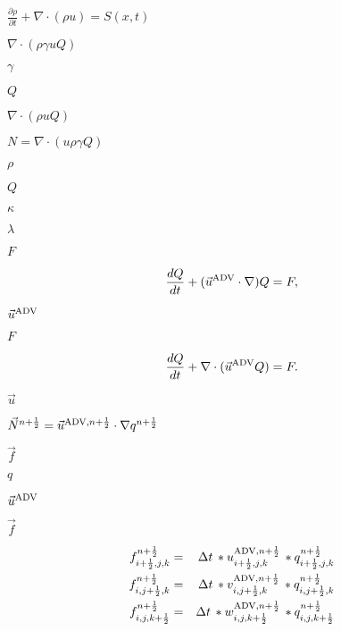 \documentclass{article}
\begin{document}
$ \frac{\partial \rho}{\partial t} + \nabla \cdot (\rho u) = S(x,t) $
\pagebreak

$ \nabla \cdot (\rho \gamma u Q)$
\pagebreak

$\gamma$
\pagebreak

$Q$
\pagebreak

$ \nabla \cdot (\rho u Q)$
\pagebreak

$N = \nabla \cdot (u \rho \gamma Q)$
\pagebreak

$\rho$
\pagebreak

$ Q $
\pagebreak

$ \kappa $
\pagebreak

$ \lambda $
\pagebreak

$ F $
\pagebreak

\[

      \frac{dQ}{dt} + (\vec{u}^{\mbox{\scriptsize ADV}} \cdot \nabla)Q = F,

 \]
\pagebreak

$\vec{u}^{\mbox{\scriptsize
 ADV}}$
\pagebreak

$F$
\pagebreak

\[

      \frac{dQ}{dt} + \nabla \cdot (\vec{u}^{\mbox{\scriptsize ADV}} Q) = F.

 \]
\pagebreak

$\vec{u}$
\pagebreak

$ \vec{N}^{n+\frac{1}{2}} =
\vec{u}^{\mbox{\scriptsize ADV},n+\frac{1}{2}} \cdot \nabla
q^{n+\frac{1}{2}} $
\pagebreak

$ \vec{f} $
\pagebreak

$ q $
\pagebreak

$ \vec{u}^{\mbox{\scriptsize ADV}} $
\pagebreak

$
  \vec{f} $
\pagebreak

\begin{eqnarray*}
 
      f_{i+\frac{1}{2},j,k}^{n+\frac{1}{2}} &=& \Delta t \,
*u_{i+\frac{1}{2},j,k}^{\mbox{\scriptsize ADV},n+\frac{1}{2}} \,
*q_{i+\frac{1}{2},j,k}^{n+\frac{1}{2}} \\
      f_{i,j+\frac{1}{2},k}^{n+\frac{1}{2}} &=& \Delta t \,
*v_{i,j+\frac{1}{2},k}^{\mbox{\scriptsize ADV},n+\frac{1}{2}} \,
*q_{i,j+\frac{1}{2},k}^{n+\frac{1}{2}} \\
      f_{i,j,k+\frac{1}{2}}^{n+\frac{1}{2}} &=& \Delta t \,
*w_{i,j,k+\frac{1}{2}}^{\mbox{\scriptsize ADV},n+\frac{1}{2}} \,
*q_{i,j,k+\frac{1}{2}}^{n+\frac{1}{2}}
 
  \end{eqnarray*}
\pagebreak
\end{document}
